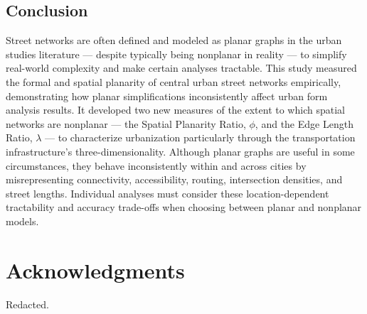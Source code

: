 \documentclass[Afour,sageh,times]{sagej}
\begin{document}
\subsection{Conclusion}

Street networks are often defined and modeled as planar graphs in the urban studies literature --- despite typically being nonplanar in reality --- to simplify real-world complexity and make certain analyses tractable. This study measured the formal and spatial planarity of central urban street networks empirically, demonstrating how planar simplifications inconsistently affect urban form analysis results. It developed two new measures of the extent to which spatial networks are nonplanar --- the Spatial Planarity Ratio, $\phi$, and the Edge Length Ratio, $\lambda$ ---  to characterize urbanization particularly through the transportation infrastructure's three-dimensionality. Although planar graphs are useful in some circumstances, they behave inconsistently within and across cities by misrepresenting connectivity, accessibility, routing, intersection densities, and street lengths. Individual analyses must consider these location-dependent tractability and accuracy trade-offs when choosing between planar and nonplanar models.



\section{Acknowledgments}

Redacted.





\end{document}
